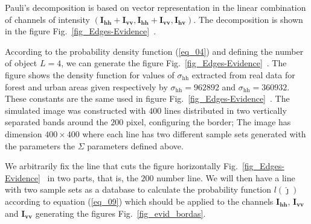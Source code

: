 \documentclass[conference]{IEEEtran}
\begin{document}
Pauli's decomposition is based on vector representation in the linear combination of channels of intensity $(\mathbf{I_\text{hh}+I_{\text{vv}}}, \mathbf{I_\text{hh}+I_{\text{vv}}}, \mathbf{I_\text{hv}})$. The decomposition is shown in the figure Fig.~\ref{fig_Edges-Evidence}~. 

According to the probability density function (\ref{eq_04}) and defining the number of object $L=4$, we can generate the figure Fig.~\ref{fig_Edges-Evidence}~. The figure shows the density function for values of $\sigma_\text{hh}$ extracted from real data for forest and urban areas given respectively by $\sigma_\text{hh}=962892$ and $\sigma_\text{hh}= 360932$.  These constants are the same used in figure Fig.~\ref{fig_Edges-Evidence}~.
%
The simulated image was constructed with $400$ lines distributed in two vertically separated bands around the $200$ pixel, configuring the border; The image has dimension $400 \times 400$ where each line has two different sample sets generated with the parameters the $\Sigma$ parameters defined above.  

We arbitrarily fix the line that cuts the figure horizontally Fig.~\ref{fig_Edges-Evidence}~ in two parts, that is, the $200$ number line. We will then have a line with two sample sets as a database to calculate the probability function $l(\widehat\jmath)$ according to equation (\ref{eq_09}) which should be applied to the channels $\mathbf{I_\text{hh}}$, $\mathbf{I_\text{vv}}$ and $\mathbf{I_{\text{vv}}}$ generating the figures Fig.~\ref{fig_evid_bordas}.  
    
\end{document}
